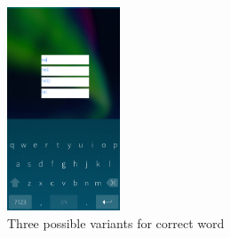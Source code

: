 \documentclass[conference]{IEEEtran}
\begin{document}
\begin{figure}[!hbt]
	\centering
	\includegraphics[width=0.3\textwidth]{images/3.png}
	\caption{
		 Three possible variants for correct word}
	\label{three}
\end{figure}
\
\end{document}
